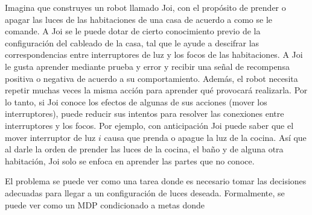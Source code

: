 Imagina que construyes un robot llamado Joi, con el propósito de prender o apagar las luces de las habitaciones 
de una casa de acuerdo a como se le comande.
A Joi se le puede dotar de cierto conocimiento previo de la configuración
del cableado de la casa, tal que le ayude a descifrar las correspondencias entre
interruptores de luz y los focos de las habitaciones. 
 A Joi le gusta aprender mediante prueba
 y error y recibir una señal de recompensa positiva o negativa de acuerdo a su comportamiento. Además, el robot 
 necesita repetir muchas veces la misma acción para aprender
 qué provocará realizarla. Por lo tanto, si Joi conoce los efectos de algunas de sus acciones (mover los interruptores), puede reducir sus intentos para
 resolver las conexiones entre interruptores y los focos. 
 Por ejemplo, con anticipación Joi puede saber que el mover interruptor de luz $i$ causa que
prenda o apague la luz de la cocina.
 Así que al darle la orden de prender las luces de la cocina, el baño y de alguna otra habitación, Joi solo se enfoca en aprender las partes que no
 conoce.
 
 El problema se puede ver como una tarea donde es necesario tomar las
 decisiones adecuadas para llegar a un configuración de luces deseada. Formalmente, se puede ver como un MDP condicionado a metas donde 
 
